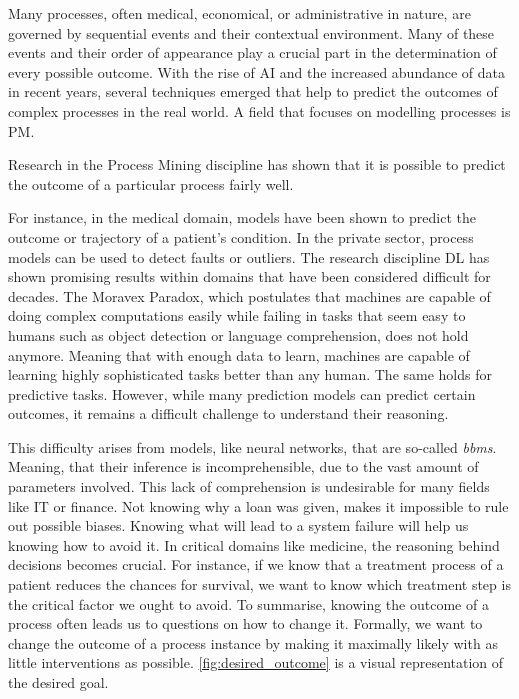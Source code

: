 \documentclass[./../../paper.tex]{subfiles}
\begin{document}
Many processes, often medical, economical, or administrative in nature, are governed by sequential events and their contextual environment. Many of these events and their order of appearance play a crucial part in the determination of every possible outcome\cite{vanderaalst_ProcessMiningManifesto_2012}. With the rise of AI and the increased abundance of data in recent years, several techniques emerged that help to predict the outcomes of complex processes in the real world. A field that focuses on modelling processes is \gls{PM}.

Research in the Process Mining discipline has shown that it is possible to predict the outcome of a particular process fairly well\cite{tax_PredictiveBusinessProcess_2017a,klimek_Longtermseriesforecasting_2021}.

For instance, in the medical domain, models have been shown to predict the outcome or trajectory of a patient's condition\cite{mannhardt_Analyzingtrajectoriespatients_2017}. In the private sector, process models can be used to detect faults or outliers. The research discipline \gls{DL} has shown promising results within domains that have been considered difficult for decades. The Moravex Paradox\cite{agrawal_studyphenomenonMoravec_2010}, which postulates that machines are capable of doing complex computations easily while failing in tasks that seem easy to humans such as object detection or language comprehension, does not hold anymore. Meaning that with enough data to learn, machines are capable of learning highly sophisticated tasks better than any human. The same holds for predictive tasks. However, while many prediction models can predict certain outcomes, it remains a difficult challenge to understand their reasoning. 

This difficulty arises from models, like neural networks, that are so-called \emph{\glspl{bbm}}. Meaning, that their inference is incomprehensible, due to the vast amount of parameters involved. This lack of comprehension is undesirable for many fields like IT or finance. Not knowing why a loan was given, makes it impossible to rule out possible biases. Knowing what will lead to a system failure will help us knowing how to avoid it. In critical domains like medicine, the reasoning behind decisions becomes crucial. For instance, if we know that a treatment process of a patient reduces the chances for survival, we want to know which treatment step is the critical factor we ought to avoid. To summarise, knowing the outcome of a process often leads us to questions on how to change it. Formally, we want to change the outcome of a process instance by making it maximally likely with as little interventions as possible\cite{molnar2019}. \autoref{fig:desired_outcome} is a visual representation of the desired goal.
\end{document}
